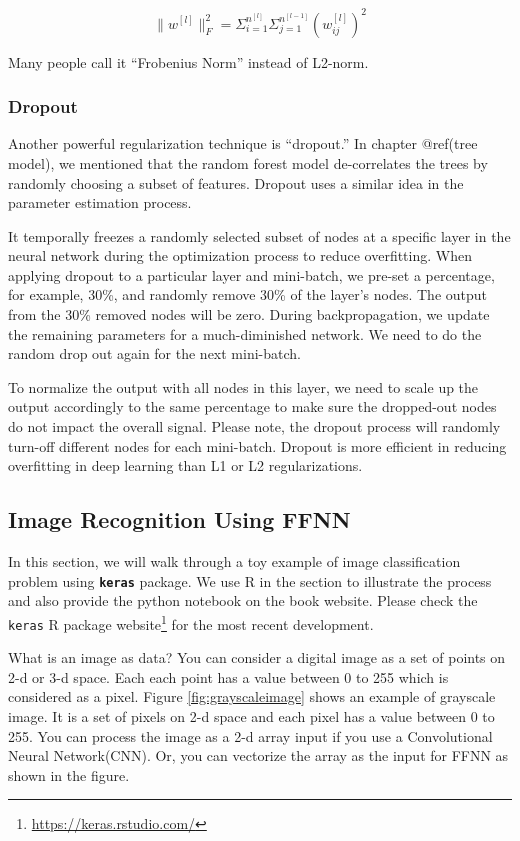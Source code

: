 \documentclass[12pt,]{krantz}
\renewcommand{\href}[2]{#2\footnote{\url{#1}}}
\begin{document}
\[\parallel w^{[l]} \parallel^2_F = \Sigma_{i=1}^{n^{[l]}}\Sigma_{j=1}^{n^{[l-1]}} (w^{[l]}_{ij})^2\]

Many people call it ``Frobenius Norm'' instead of L2-norm.

\hypertarget{dropout}{%
\subsubsection{Dropout}\label{dropout}}

Another powerful regularization technique is ``dropout.'' In chapter @ref(tree model), we mentioned that the random forest model de-correlates the trees by randomly choosing a subset of features. Dropout uses a similar idea in the parameter estimation process.

It temporally freezes a randomly selected subset of nodes at a specific layer in the neural network during the optimization process to reduce overfitting. When applying dropout to a particular layer and mini-batch, we pre-set a percentage, for example, 30\%, and randomly remove 30\% of the layer's nodes. The output from the 30\% removed nodes will be zero. During backpropagation, we update the remaining parameters for a much-diminished network. We need to do the random drop out again for the next mini-batch.

To normalize the output with all nodes in this layer, we need to scale up the output accordingly to the same percentage to make sure the dropped-out nodes do not impact the overall signal. Please note, the dropout process will randomly turn-off different nodes for each mini-batch. Dropout is more efficient in reducing overfitting in deep learning than L1 or L2 regularizations.

\hypertarget{ffnnexample}{%
\subsection{Image Recognition Using FFNN}\label{ffnnexample}}

In this section, we will walk through a toy example of image classification problem using \textbf{\texttt{keras}} package. We use R in the section to illustrate the process and also provide the python notebook on the book website. Please check the \href{https://keras.rstudio.com/}{\texttt{keras} R package website} for the most recent development.

What is an image as data? You can consider a digital image as a set of points on 2-d or 3-d space. Each each point has a value between 0 to 255 which is considered as a pixel. Figure \ref{fig:grayscaleimage} shows an example of grayscale image. It is a set of pixels on 2-d space and each pixel has a value between 0 to 255. You can process the image as a 2-d array input if you use a Convolutional Neural Network(CNN). Or, you can vectorize the array as the input for FFNN as shown in the figure.
\end{document}
